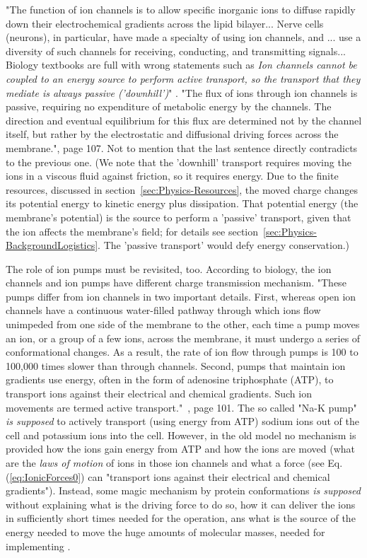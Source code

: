 "The function of \hypertarget{Ion_Channel}{ion channels} is to allow specific inorganic ions
to diffuse rapidly down their electrochemical gradients across the lipid bilayer...
Nerve cells (neurons), in particular, have made a specialty of using ion channels,
and ... use a diversity of such channels for receiving, conducting, and transmitting signals...
Biology textbooks are full with wrong statements such as \textit{Ion channels cannot be coupled to an energy source to perform active transport,
so the transport that they mediate is always passive ('downhill')}" \cite{MolecularBiology:2002}.
 "The flux of ions through ion channels is passive,
requiring no expenditure of metabolic energy by the
channels. The direction and eventual equilibrium
for this flux are determined not by the channel itself,
but rather by the electrostatic and diffusional driving
forces across the membrane."\cite{PrinciplesNeuralScience:2013}, page 107. Not to mention that the last sentence directly contradicts to the previous one.
(We note that the 'downhill' transport requires moving
the ions in a viscous fluid against friction, so it requires energy.
Due to the finite resources, discussed in section~\ref{sec:Physics-Resources}, the moved charge changes its potential energy to kinetic
energy plus dissipation. That potential energy (the membrane's potential) is the source to perform a 'passive' transport, given that the ion affects the membrane's field; for details see section~\ref{sec:Physics-BackgroundLogistics}.
The 'passive transport' would defy energy conservation.) 

The role of ion pumps must be revisited, too. According to
biology,
the ion channels and ion pumps have different charge transmission mechanism.
"These pumps differ from ion channels in two
important details. First, whereas open ion channels
have a continuous water-filled pathway through which
ions flow unimpeded from one side of the membrane
to the other, each time a pump moves an ion, or a group
of a few ions, across the membrane, it must undergo a
series of conformational changes. As a result, the rate of
ion flow through pumps is 100 to 100,000 times slower
than through channels. Second, pumps that maintain
ion gradients use energy, often in the form of adenosine triphosphate (ATP), to transport ions against their
electrical and chemical gradients. Such ion movements
are termed active transport."~\cite{PrinciplesNeuralScience:2013}, page 101.
The so called "Na-K pump" \textit{is supposed} to actively transport (using energy from \gls{ATP})
sodium ions out of the cell and potassium ions into the cell.
However, in the old model no mechanism is provided how the ions gain energy from \gls{ATP} and how the ions are moved (what are the \textit{laws of motion} of ions in those ion channels and what a force (see Eq.(\ref{eq:IonicForces0}) 
can "transport ions against their electrical and chemical gradients").
Instead, some magic
mechanism by protein conformations \textit{is supposed}
without explaining what is the driving force to do so,
how it can deliver the ions in
sufficiently short times needed for the operation,
ans what is the source of the energy needed to move 
the huge amounts of molecular masses,
needed for implementing .


